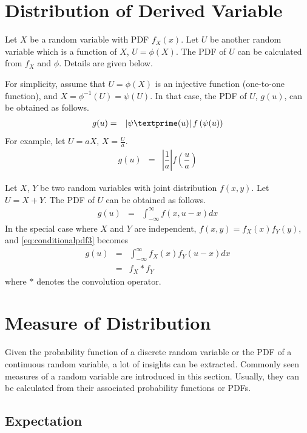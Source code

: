 \section{Distribution of Derived Variable}

Let $X$ be a random variable with PDF $f_X(x)$. Let $U$ be another random variable which is a function of $X$, $U=\phi(X)$. The PDF of $U$ can be calculated from $f_X$ and $\phi$. Details are given below.

For simplicity, assume that $U=\phi(X)$ is an injective function (one-to-one function), and $X=\phi^{-1}(U)=\psi(U)$. In that case, the PDF of $U$, $g(u)$, can be obtained as follows.
\begin{eqnarray}
  g(u) &=& \left|\psi\textprime(u)\right|f\left(\psi(u)\right) \nonumber
\end{eqnarray}
For example, let $U=aX$, $X=\frac{U}{a}$.
\begin{eqnarray}
  g(u) &=& \left|\dfrac{1}{a}\right|f\left(\dfrac{u}{a}\right) \nonumber
\end{eqnarray}

Let $X$, $Y$ be two random variables with joint distribution $f(x, y)$. Let $U=X+Y$. The PDF of $U$ can be obtained as follows.
\begin{eqnarray}
  g(u) &=& \int_{-\infty}^{\infty} f(x, u-x)dx \label{eq:conditionalpdf3}
\end{eqnarray}
In the special case where $X$ and $Y$ are independent, $f(x, y) = f_X(x)f_Y(y)$, and \eqref{eq:conditionalpdf3} becomes
\begin{eqnarray}
  g(u) &=& \int_{-\infty}^{\infty} f_X(x)f_Y(u-x)dx \nonumber \\
  &=& f_X * f_Y \nonumber
\end{eqnarray}
where $*$ denotes the convolution operator.

\section{Measure of Distribution}

Given the probability function of a discrete random variable or the PDF of a continuous random variable, a lot of insights can be extracted. Commonly seen measures of a random variable are introduced in this section. Usually, they can be calculated from their associated probability functions or PDFs.

\subsection{Expectation}


